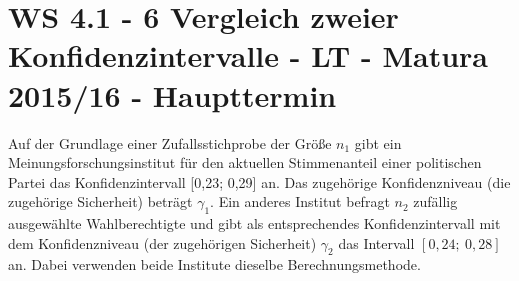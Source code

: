\section{WS 4.1 - 6 Vergleich zweier Konfidenzintervalle - LT - Matura 2015/16 - Haupttermin}

\begin{beispiel}[WS 4.1]{1} %
Auf der Grundlage einer Zufallsstichprobe der Größe $n_1$ gibt ein Meinungsforschungsinstitut für den aktuellen Stimmenanteil einer politischen Partei das Konfidenzintervall [0,23; 0,29] an. Das zugehörige Konfidenzniveau (die zugehörige Sicherheit) beträgt $\gamma_1$.
Ein anderes Institut befragt $n_2$ zufällig ausgewählte Wahlberechtigte und gibt als entsprechendes Konfidenzintervall mit dem Konfidenzniveau (der zugehörigen Sicherheit) $\gamma_2$ das Intervall $[0,24;~0,28]$ an. Dabei verwenden beide Institute dieselbe Berechnungsmethode.
\leer

\end{beispiel}